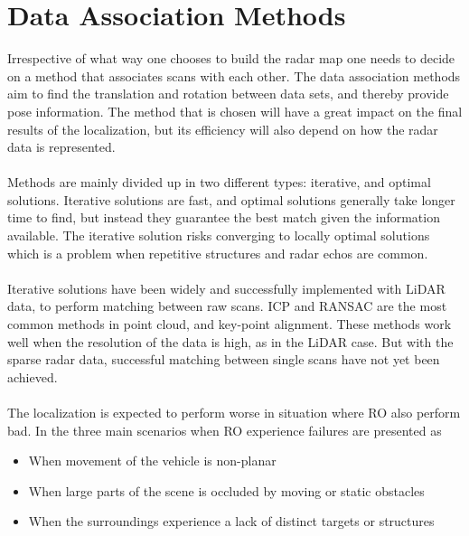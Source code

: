 \section{Data Association Methods}
Irrespective of what way one chooses to build the radar map one needs to decide on a method that associates scans with each other. The data association methods aim to find the translation and rotation between data sets, and thereby provide pose information. The method that is chosen will have a great impact on the final results of the localization, but its efficiency will also depend on how the radar data is represented. 
\\\\
Methods are mainly divided up in two different types: iterative, and optimal solutions. Iterative solutions are fast, and optimal solutions generally take longer time to find, but instead they guarantee the best match given the information available. The iterative solution risks converging to locally optimal solutions which is a problem when repetitive structures and radar echos are common.
\\\\
Iterative solutions have been widely and successfully implemented with \ac{LiDAR} data, to perform matching between raw scans. ICP and \ac{RANSAC} are the most common methods in point cloud, and key-point alignment. These methods work well when the resolution of the data is high, as in the \ac{LiDAR} case. But with the sparse radar data, successful matching between single scans have not yet been achieved.
\\\\
The localization is expected to perform worse in situation where RO also perform bad. In \cite{aldera_what_2019} the three main scenarios when RO experience failures are presented as  
\begin{itemize}
    \item When movement of the vehicle is non-planar 
    \item When large parts of the scene is occluded by moving or static obstacles
    \item When the surroundings experience a lack of distinct targets or structures
\end{itemize}